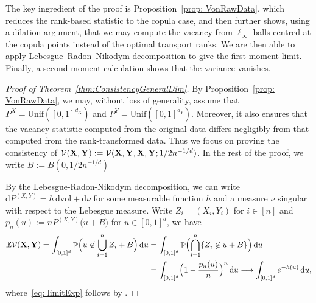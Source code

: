 \documentclass[11pt]{article}
\DeclareMathOperator{\Prob}{\mathbb{P}}
\newcommand{\E}{\mathbb{E}}
\begin{document}
The key ingredient of the proof is Proposition~\ref{prop: VonRawData}, which reduces the rank-based statistic to the copula case, and then further shows, using a dilation argument, that we may compute the vacancy from $\ell_\infty$ balls centred at the copula points instead of the optimal transport ranks. We are then able to apply Lebesgue--Radon--Nikodym decomposition to give the first-moment limit. Finally, a second-moment calculation shows that the variance vanishes.

\begin{proof}[Proof of Theorem~\ref{thm:ConsistencyGeneralDim}]  
By Proposition~\ref{prop: VonRawData}, we may, without loss of generality, assume that $P^X = \mathrm{Unif}([0,1]^{d_X})$ and $P^Y = \mathrm{Unif}([0,1]^{d_Y})$. Moreover, it also ensures that the vacancy statistic computed from the original data differs negligibly from that computed from the rank-transformed data. Thus we focus on proving the consistency of $\mathcal{V}({\bf X}, {\bf Y}) := \mathcal{V}({\bf X}, {\bf Y}, {\bf X}, {\bf Y}; 1/2 n^{-1/d})$. In the rest of the proof, we write $B := B(0, 1/2 n^{-1/d})$ 

By the Lebesgue-Radon-Nikodym decomposition, we can write $\mathrm{d}P^{(X, Y)} = h \, \mathrm{d}\mathrm{vol} + \mathrm{d}\nu$ for some measurable function $h$ and a measure $\nu$ singular with respect to the Lebesgue measure. Write $Z_i = (X_i, Y_i)$ for $i \in [n]$ and $p_n(u) := n P^{(X, Y)}\bigl(u + B\bigr)$ for $u \in [0, 1]^d$, we have
\begin{align}
    \E \mathcal{V}({\bf X},{\bf Y}) = \int_{[0, 1]^d} \Prob\Bigl(u \not \in \bigcup_{i=1}^n Z_i +B \Bigr) \, \mathrm{d}u &= \int_{[0, 1]^d} \Prob\Bigl(\bigcap_{i = 1}^n \{Z_i \not\in u+B \}\Bigr) \, \mathrm{d}u \notag \\ 
    & = \int_{[0, 1]^d} \Bigl(1 - \frac{p_n(u)}{n}\Bigr)^n \, \mathrm{d}u \longrightarrow \int_{[0, 1]^d}  e^{-h(u)} \, \mathrm{d}u \label{eq: limitExp},
\end{align}
where~\eqref{eq: limitExp} follows by \citet[][Theorem 3.22]{folland1999real}. 


\end{proof}
\end{document}
